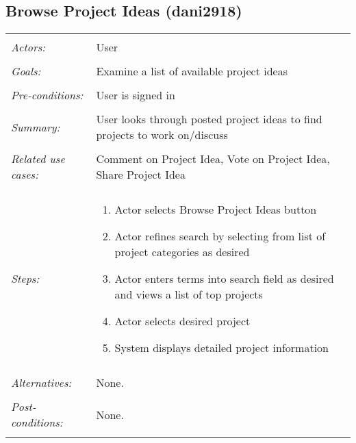 \documentclass[11pt]{report}
\begin{document}
\subsection{Browse Project Ideas (dani2918)}
\begin{tabular}{ p{2cm} p{12cm} }
 \hline
 \\
 \textit{Actors:} & User \\ 
 \\
 \textit{Goals:} & Examine a list of available project ideas  \\
 \\
 \textit{Pre-conditions:} & User is signed in  \\
 \\
 \textit{Summary:} & User looks through posted project ideas to find projects to work on/discuss \\ 
 \\
 \textit{Related use cases:} & Comment on Project Idea, Vote on Project Idea, Share Project Idea \\ 
 \\
 \textit{Steps:} & \begin{enumerate}
  \item Actor selects Browse Project Ideas button
  \item Actor refines search by selecting from list of project categories as desired
  \item Actor enters terms into search field as desired and views a list of top projects
  \item Actor selects desired project
  \item System displays detailed project information
 \end{enumerate} \\
 \\
 \textit{Alternatives:} & None. \\
 \\
 \textit{Post-conditions:} & None. \\
 \\
\hline
\end{tabular}
\end{document}
